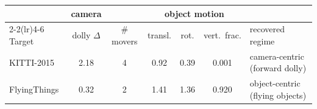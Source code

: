 \begin{tabular}{l cc ccc l}
\toprule
 & camera & & \multicolumn{3}{c}{object motion} & \\
\cmidrule(lr){2-2}\cmidrule(lr){4-6}
Target & dolly $\Delta$ & \# movers & transl. & rot. & vert.\ frac. & recovered regime \\
\midrule
KITTI-2015 & 2.18 & 4 & 0.92 & 0.39 & 0.001 & camera-centric (forward dolly) \\
FlyingThings & 0.32 & 2 & 1.41 & 1.36 & 0.920 & object-centric (flying objects) \\
\bottomrule
\end{tabular}
